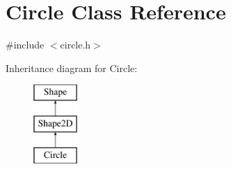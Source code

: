 \hypertarget{classCircle}{\section{Circle Class Reference}
\label{classCircle}
}


{\ttfamily \#include $<$circle.\-h$>$}

Inheritance diagram for Circle\-:\begin{figure}[H]
\begin{center}
\leavevmode
\includegraphics[height=3.000000cm]{classCircle}
\end{center}
\end{figure}
